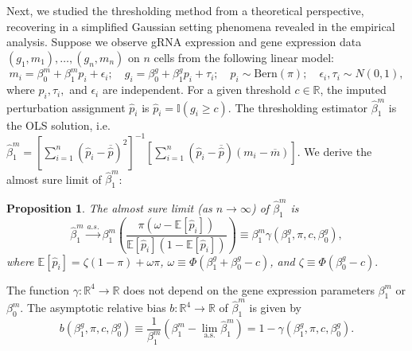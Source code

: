 \documentclass[12pt]{article}
\newtheorem{proposition}{Proposition}
\begin{document}
Next, we studied the thresholding method from a theoretical perspective, recovering in a simplified Gaussian setting phenomena revealed in the empirical analysis. Suppose we observe gRNA expression and gene expression data $(g_1, m_1), \dots, (g_n, m_n)$ on $n$ cells from the following linear model:
\begin{equation}\label{theoretical_model}
m_i = \beta^m_0 + \beta^m_1 p_i + \epsilon_i; \quad
g_i = \beta^g_0 + \beta^g_1 p_i + \tau_i; \quad
p_i \sim \textrm{Bern}(\pi); \quad
\epsilon_i, \tau_i \sim N(0,1),
\end{equation}
where $p_i, \tau_i,$ and $\epsilon_i$ are independent. For a given threshold $c \in \mathbb{R}$, the imputed perturbation assignment $\hat{p}_i$ is $\hat{p}_i = \mathbb{I}(g_i \geq c).$ The thresholding estimator $\hat{\beta}^m_1$ is the OLS solution, i.e. $\hat{\beta}^m_1 = \left[\sum_{i=1}^n (\hat{p}_i - \overline{\hat{p}})^2\right]^{-1}\left[\sum_{i=1}^n (\hat{p}_i - \overline{\hat{p}})(m_i - \overline{m})\right].$ We derive the almost sure limit of $\hat{\beta}^m_1$: 
\begin{proposition}\label{prop:convergence}
	The almost sure limit (as $n \to \infty$) of $\hat{\beta}^m_1$ is
	\begin{equation}\label{thresh_est_intercepts}
	\hat{\beta}^m_1 \xrightarrow{a.s.} \beta^m_1 \left(\frac{ \pi( \omega - \mathbb{E}[ \hat{p}_i ])}{ \mathbb{E}[\hat{p}_i] (1 - \mathbb{E}[\hat{p}_i])}\right) \equiv \beta^m_1 \gamma(\beta^g_1, \pi, c, \beta^g_0), 
	\end{equation} where 
	$
	\mathbb{E}[\hat{p}_i] = \zeta(1-\pi) + \omega\pi$, $\omega \equiv \Phi\left(\beta_1^g + \beta_0^g -c \right)$, and $\zeta \equiv \Phi\left( \beta^g_0 - c \right).$
\end{proposition}
The function $\gamma: \mathbb{R}^4 \to \mathbb{R}$ does not depend on the gene expression parameters $\beta^m_1$ or $\beta^m_0$. The asymptotic relative bias $b: \mathbb{R}^4 \to \mathbb{R}$ of $\hat{\beta}^m_1$ is given by
$$b(\beta^g_1, \pi, c, \beta^g_0)  \equiv \frac{1}{\beta^m_1} \left(\beta^m_1 - \lim_\textrm{a.s.} \hat{\beta}^m_1 \right) = 1 - \gamma(\beta^g_1, \pi, c, \beta^g_0).$$
\end{document}
